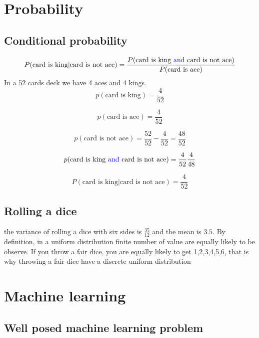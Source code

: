 \documentclass[11pt, oneside]{article}   	%
\begin{document}
\section{Probability}
\subsection{Conditional probability}

\begin{equation}
P(\text{card is king}|\text{card is not ace}) = \frac{P(\text{card is king \textcolor{blue}{and} card is not ace})}{P(\text{card is ace})}
\end{equation}
In a 52 cards deck we have 4 aces and 4 kings.
\begin{equation}
p(\text{card is king}) = \frac{4}{52} 
\end{equation}

\begin{equation}
p(\text{card is ace}) = \frac{4}{52} 
\end{equation}

\begin{equation}
p(\text{card is not ace}) = \frac{52}{52}- \frac{4}{52} = \frac{48}{52}
\end{equation}

\begin{equation}
p(\text{card is king \textcolor{blue}{and} card is not ace}) =\frac{4}{52} \frac{4}{48}
\end{equation}

\begin{equation}
P(\text{card is king}|\text{card is not ace}) = \frac{4}{52}
\end{equation}

\subsection{Rolling a dice}
the variance of rolling a dice with six sides is $\frac{35}{12}$ and the mean is $3.5$.
By definition, in a uniform distribution finite number of value are equally likely to be observe. If you throw a fair dice, you are equally likely to get 1,2,3,4,5,6,
that is why throwing a fair dice have a discrete uniform distribution

\section{Machine learning}
\subsection{Well posed machine learning problem}
\end{document}
